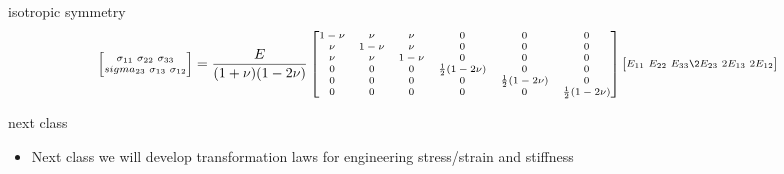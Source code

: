 \documentclass[
  letterpaper,
  ignorenonframetext,
  aspectratio=43,
  handout,
  12pt]{beamer}
\providecommand{\tightlist}{%
  \setlength{\itemsep}{0pt}\setlength{\parskip}{0pt}}
\providecommand{\tightlist}{%
\setlength{\itemsep}{0pt}\setlength{\parskip}{0pt}}
\begin{document}
\begin{frame}{isotropic symmetry}
\protect\hypertarget{isotropic-symmetry}{}
\[\scriptsize \begin{bmatrix}
  \sigma_{11}\ \sigma_{22} \ \sigma_{33} \\sigma_{23} \ \sigma_{13} \ \sigma_{12}
  \end{bmatrix}
  = \frac{E}{(1+\nu)(1-2\nu)}\begin{bmatrix}
  1-\nu & \nu & \nu & 0 & 0 & 0 \\
  \nu & 1-\nu & \nu & 0 & 0 & 0 \\
  \nu & \nu & 1-\nu & 0 & 0 & 0 \\
  0 & 0 & 0 & \frac{1}{2}(1-2\nu) & 0 & 0 \\
  0 & 0 & 0 & 0 & \frac{1}{2}(1-2\nu) & 0 \\
  0 & 0 & 0 & 0 & 0 & \frac{1}{2}(1-2\nu)
  \end{bmatrix}\begin{bmatrix}
  E_{11}\ E_{22} \ E_{33} \2E_{23} \ 2E_{13} \ 2E_{12}
\end{bmatrix}\]
\end{frame}

\begin{frame}{next class}
\protect\hypertarget{next-class}{}
\begin{itemize}
\tightlist
\item
  Next class we will develop transformation laws for engineering
  stress/strain and stiffness
\end{itemize}
\end{frame}
\end{document}
